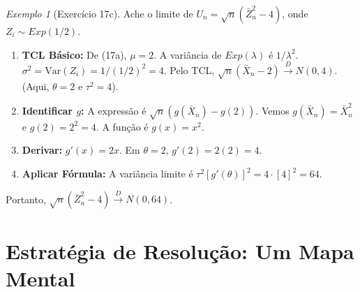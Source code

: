 \documentclass[a4paper, 10pt]{article} %
\theoremstyle{definition}
\theoremstyle{plain}
\theoremstyle{remark}
\newtheorem{example}{Exemplo}[section]
\newcommand{\Var}{\text{Var}}
\newcommand{\dto}{\xrightarrow{D}}      %
\newcommand{\Xn}{\bar{X}_n}             %
\begin{document}
\begin{example}[Exercício 17c]
    Ache o limite de $U_n = \sqrt{n}(\bar{Z}_n^2 - 4)$, onde $Z_i \sim Exp(1/2)$.
    \begin{enumerate}
        \item \textbf{TCL Básico:} De (17a), $\mu = 2$. A variância de $Exp(\lambda)$ é $1/\lambda^2$.
        $\sigma^2 = \Var(Z_i) = 1 / (1/2)^2 = 4$.
        Pelo TCL, $\sqrt{n}(\Xn - 2) \dto N(0, 4)$.
        (Aqui, $\theta = 2$ e $\tau^2 = 4$).
        \item \textbf{Identificar $g$:} A expressão é $\sqrt{n}(g(\Xn) - g(2))$.
        Vemos $g(\Xn) = \Xn^2$ e $g(2) = 2^2 = 4$. A função é $g(x) = x^2$.
        \item \textbf{Derivar:} $g'(x) = 2x$.
        Em $\theta=2$, $g'(2) = 2(2) = 4$.
        \item \textbf{Aplicar Fórmula:} A variância limite é $\tau^2 [g'(\theta)]^2 = 4 \cdot [4]^2 = 64$.
    \end{enumerate}
    Portanto, $\sqrt{n}(\bar{Z}_n^2 - 4) \dto N(0, 64)$.
\end{example}

\section{Estratégia de Resolução: Um Mapa Mental}
\label{sec:estrategia}
\end{document}
